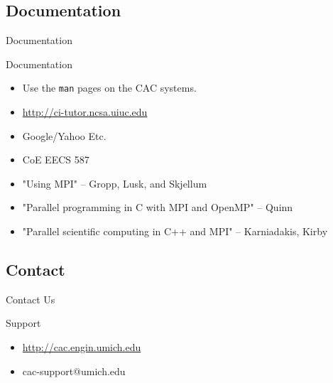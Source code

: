 \documentclass{beamer}
\begin{document}
\subsection{Documentation}
\begin{frame}{Documentation}
\begin{block}{Documentation}
 \begin{itemize}
  \item Use the \texttt{man} pages on the CAC systems.
  \item \url{http://ci-tutor.ncsa.uiuc.edu}
  \item Google/Yahoo Etc.
  \item CoE EECS 587
  \item "Using MPI" -- Gropp, Lusk, and Skjellum  
  \item "Parallel programming in C with MPI and OpenMP" -- Quinn
  \item "Parallel scientific computing in C++ and MPI" -- Karniadakis, Kirby
 \end{itemize}
\end{block}

\end{frame}

\subsection{Contact}
\begin{frame}{Contact Us}
 \begin{block}{Support}
  \begin{itemize}
   \item \url{http://cac.engin.umich.edu}
   \item cac-support@umich.edu
  \end{itemize}
 \end{block}
\end{frame}
\end{document}
